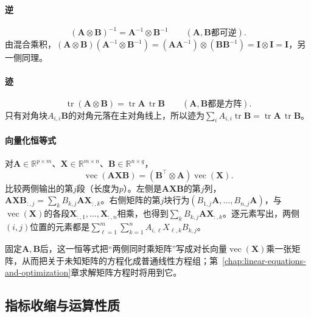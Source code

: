 \paragraph{逆}
\[
 (\bm A\otimes\bm B)^{-1}=\bm A^{-1}\otimes\bm B^{-1}\qquad(\bm A,\bm B\text{都可逆}).
\]
由混合乘积，$(\bm A\otimes\bm B)(\bm A^{-1}\otimes\bm B^{-1})=(\bm A\bm A^{-1})\otimes(\bm B\bm B^{-1})=\bm I\otimes\bm I=\bm I$，另一侧同理。

\paragraph{迹}
\[
 \operatorname{tr}(\bm A\otimes\bm B)=\operatorname{tr}\bm A\,\operatorname{tr}\bm B\qquad(\bm A,\bm B\text{都是方阵}).
\]
只有对角块$A_{i,i}\bm B$的对角元落在主对角线上，所以迹为$\sum_iA_{i,i}\operatorname{tr}\bm B=\operatorname{tr}\bm A\,\operatorname{tr}\bm B$。

\paragraph{向量化恒等式}
对$\bm A\in\mathbb R^{p\times m}$、$\bm X\in\mathbb R^{m\times n}$、$\bm B\in\mathbb R^{n\times q}$，
\begin{equation}
 \operatorname{vec}(\bm A\bm X\bm B)
 =(\bm B^\top\otimes\bm A)\operatorname{vec}(\bm X).
 \label{eq:matrix-analysis-vec-kronecker}
\end{equation}
比较两侧输出的第$j$段（长度为$p$）。左侧是$\bm A\bm X\bm B$的第$j$列，$\bm A\bm X\bm B_{:,j}=\sum_kB_{k,j}\bm A\bm X_{:,k}$。右侧矩阵的第$j$块行为$(B_{1,j}\bm A,\ldots,B_{n,j}\bm A)$，与$\operatorname{vec}(\bm X)$的各段$\bm X_{:,1},\ldots,\bm X_{:,n}$相乘，也得到$\sum_kB_{k,j}\bm A\bm X_{:,k}$。逐元素写出，两侧$(i,j)$位置的元素都是$\sum_{\ell=1}^m\sum_{k=1}^n A_{i,\ell}X_{\ell,k}B_{k,j}$。

固定$\bm A,\bm B$后，这一恒等式把“两侧同时乘矩阵”写成对长向量$\operatorname{vec}(\bm X)$乘一张矩阵，从而把关于未知矩阵的方程化成普通线性方程组；第~\ref{chap:linear-equations-and-optimization}章求解矩阵方程时将用到它。


\subsection{指标收缩与运算性质}
\label{sec:ls-tensor-operation-properties}
\label{sec:ls-tensor-contraction}

